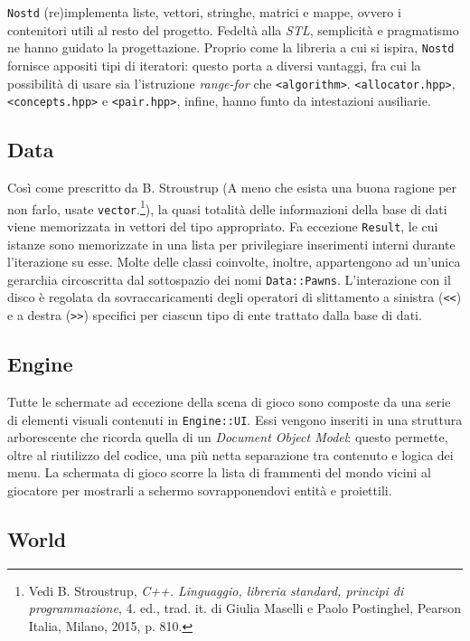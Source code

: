 \documentclass[a4paper]{article}
\begin{document}
\verb!Nostd! (re)implementa liste, vettori, stringhe, matrici e mappe, ovvero i
contenitori utili al resto del progetto. Fedelt\`a alla \emph{STL},
semplicit\`a e pragmatismo ne hanno guidato la progettazione. Proprio come la
libreria a cui si ispira, \verb!Nostd! fornisce appositi tipi di iteratori:
questo porta a diversi vantaggi, fra cui la possibilit\`a di usare sia
l'istruzione \emph{range-for} che \verb!<algorithm>!. \verb!<allocator.hpp>!,
\verb!<concepts.hpp>! e \verb!<pair.hpp>!, infine, hanno funto da intestazioni
ausiliarie.

\subsection{Data}

Così come prescritto da B. Stroustrup (\guillemotleft A meno che esista una
buona ragione per non farlo, usate \verb!vector!.\guillemotright\footnote{
\label{note1} Vedi B. Stroustrup, \emph{C++.
Linguaggio, libreria standard, principi di programmazione}, 4. ed., trad. it. di
Giulia Maselli e Paolo Postinghel, Pearson Italia, Milano, 2015, p. 810.}), la
quasi totalità delle informazioni della base di dati viene memorizzata in
vettori del tipo appropriato. Fa eccezione \verb!Result!, le cui istanze sono
memorizzate in una lista per privilegiare inserimenti interni durante
l'iterazione su esse. Molte delle classi coinvolte, inoltre, appartengono ad
un'unica gerarchia circoscritta dal sottospazio dei nomi \verb!Data::Pawns!.
L'interazione con il disco \`e regolata da sovraccaricamenti degli operatori di
slittamento a sinistra (\verb!<<!) e a destra (\verb!>>!) specifici per ciascun
tipo di ente trattato dalla base di dati.

\subsection{Engine}

Tutte le schermate ad eccezione della scena di gioco sono composte da una serie
di elementi visuali contenuti in \verb!Engine::UI!. Essi vengono inseriti in una
struttura arborescente che ricorda quella di un \emph{Document Object Model}:
questo permette, oltre al riutilizzo del codice, una più netta separazione tra
contenuto e logica dei menu. La schermata di gioco scorre la lista di frammenti
del mondo vicini al giocatore per mostrarli a schermo sovrapponendovi entit\`a
e proiettili.

\subsection{World}
\end{document}
